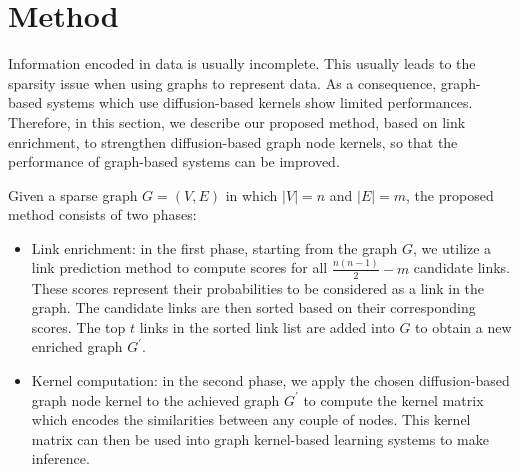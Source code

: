 \section{Method}
\label{method}
Information encoded in data is usually incomplete. This usually leads to the sparsity issue when using graphs to represent  data. As a consequence,  graph-based systems which use diffusion-based kernels show limited performances. Therefore, in this section, we describe our proposed method, based on link enrichment, to strengthen diffusion-based graph node kernels, so that the performance of graph-based systems can be improved.

Given a sparse graph $G=(V, E)$ in which $|V| = n$ and $|E| = m$, the proposed method consists of two phases:
\begin{itemize}
\item Link enrichment: in the first phase, starting from the graph $G$, we utilize a link prediction method to compute scores for all $\frac{n(n-1)}{2}-m$ candidate links. These scores represent  their probabilities to be considered as a link in the graph. The candidate links are then sorted based on their corresponding scores. The top $t$ links in the sorted link list are added into $G$ to obtain a new enriched graph $G^{'}$.
\item Kernel computation: in the second phase, we apply the chosen diffusion-based graph node kernel to the achieved graph $G^{'}$ to compute the kernel matrix which encodes the similarities between any couple of nodes. This kernel matrix can then  be used into graph kernel-based learning systems to make inference.
\end{itemize}